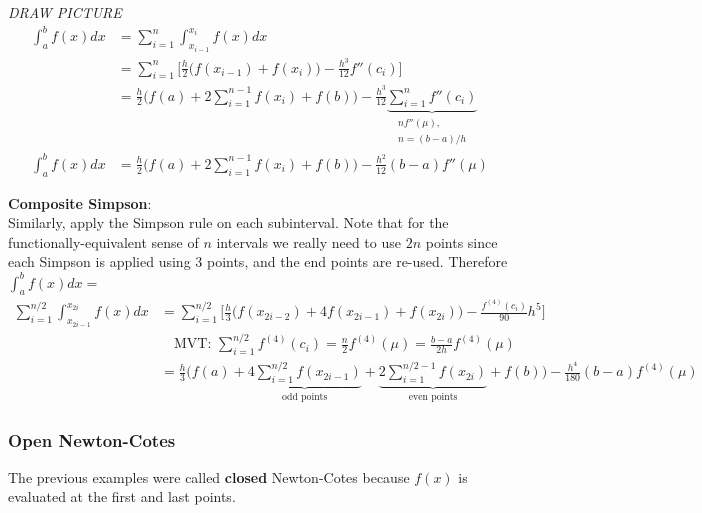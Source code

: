 \documentclass[12pt]{article}
\begin{document}
\textit{DRAW PICTURE}
\vspace*{-1em}
\begin{align*}
\int_{a}^{b} f(x)dx &= \sum_{i=1}^n \int_{x_{i-1}}^{x_i} f(x)dx\\
&= \sum_{i=1}^n \bigl[ \frac{h}{2}\bigl(f(x_{i-1}) + f(x_i)\bigr) - \frac{h^3}{12}f''(c_i) \bigr] \\
&= \frac{h}{2}\bigl(f(a) + 2\sum_{i=1}^{n-1}f(x_i) + f(b)\bigr) - \frac{h^3}{12} \underbrace{\sum_{i=1}^n f''(c_i)}_{\substack{n f''(\mu),\\ n = (b-a)/h}}\\
\int_{a}^{b} f(x)dx &= \boxed{\frac{h}{2}\bigl(f(a) + 2\sum_{i=1}^{n-1}f(x_i) + f(b)\bigr) - \frac{h^2}{12}(b-a)f''(\mu) }
\end{align*}
 
\textbf{Composite Simpson}:\\
Similarly, apply the Simpson rule on each subinterval. Note that for the functionally-equivalent sense of $n$ intervals we really need to use $2n$ points since each Simpson is applied using 3 points, and the end points are re-used. Therefore $\int_{a}^{b} f(x)dx = $
%
\begin{align*}
\sum_{i=1}^{n/2}\int_{x_{2i-1}}^{x_{2i}} f(x)dx &= \sum_{i=1}^{n/2} \bigl[ \frac{h}{3}\bigl(f(x_{2i-2}) + 4f(x_{2i-1}) + f(x_{2i})\bigr) - \frac{f^{(4)}(c_i)}{90}h^5 \bigr]\\
&\quad \text{MVT: } \sum_{i=1}^{n/2}f^{(4)}(c_i) = \frac{n}{2}f^{(4)}(\mu) = \frac{b-a}{2h}f^{(4)}(\mu)\\
&= \frac{h}{3}\bigl(f(a) + \underbrace{4\sum_{i=1}^{n/2} f(x_{2i-1})}_{\text{odd points}} + \underbrace{2\sum_{i=1}^{n/2-1} f(x_{2i})}_{\text{even points}} + f(b)\bigr) - \frac{h^4}{180}(b-a)f^{(4)}(\mu)
\end{align*}


\subsubsection*{Open Newton-Cotes}
The previous examples were called \textbf{closed} Newton-Cotes because $f(x)$ is evaluated at the first and last points.
\end{document}
